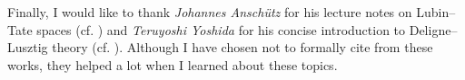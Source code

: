 \documentclass[../main.tex]{subfiles}
\begin{document}
Finally, I would like to thank \textit{Johannes Anschütz} 
for his lecture notes on Lubin--Tate spaces (cf. \cite{johannesLTS}) and 
\textit{Teruyoshi Yoshida} for his concise introduction to Deligne--Lusztig
theory (cf. \cite{yoshidaDLT}).
Although I have chosen not to formally cite from these works, 
they helped a lot when I learned about these topics.

\end{document}
